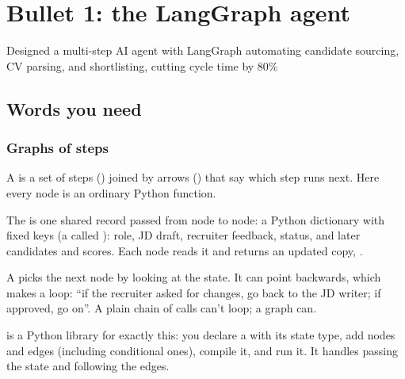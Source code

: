 \chapter{Bullet 1: the LangGraph agent}
\label{ch:langgraph}

\begin{cvline}
Designed a multi-step AI agent with LangGraph automating candidate sourcing, CV parsing, and shortlisting, cutting cycle time by 80\%
\end{cvline}

\section{Words you need}

\subsection*{Graphs of steps}

\begin{definition}
A  is a set of steps () joined by arrows () that say which step runs next. Here every node is an ordinary Python function.
\end{definition}

\begin{definition}[State]
The  is one shared record passed from node to node: a Python dictionary with fixed keys (a  called ): role, JD draft, recruiter feedback, status, and later candidates and scores. Each node reads it and returns an updated copy, .
\end{definition}

\begin{definition}
A  picks the next node by looking at the state. It can point backwards, which makes a loop: ``if the recruiter asked for changes, go back to the JD writer; if approved, go on''. A plain chain of calls can't loop; a graph can.
\end{definition}

\begin{definition}[LangGraph]
 is a Python library for exactly this: you declare a  with its state type, add nodes and edges (including conditional ones), compile it, and run it. It handles passing the state and following the edges.
\end{definition}

